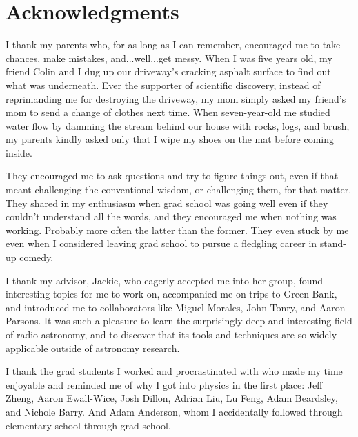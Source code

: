 % 

\cleardoublepage

\section*{Acknowledgments}

I thank my parents who, for as long as I can remember, encouraged me to take chances, make mistakes, and...well...get messy. When I was five years old, my friend Colin and I dug up our driveway's cracking asphalt surface to find out what was underneath. Ever the supporter of scientific discovery, instead of reprimanding me for destroying the driveway, my mom simply asked my friend's mom to send a change of clothes next time. When seven-year-old me studied water flow by damming the stream behind our house with rocks, logs, and brush, my parents kindly asked only that I wipe my shoes on the mat before coming inside. 

They encouraged me to ask questions and try to figure things out, even if that meant challenging the conventional wisdom, or challenging them, for that matter. They shared in my enthusiasm when grad school was going well even if they couldn't understand all the words, and they encouraged me when nothing was working. Probably more often the latter than the former. They even stuck by me even when I considered leaving grad school to pursue a fledgling career in stand-up comedy.

I thank my advisor, Jackie, who eagerly accepted me into her group, found interesting topics for me to work on, accompanied me on trips to Green Bank, and introduced me to collaborators like Miguel Morales, John Tonry, and Aaron Parsons. It was such a pleasure to learn the surprisingly deep and interesting field of radio astronomy, and to discover that its tools and techniques are so widely applicable outside of astronomy research.

I thank the grad students I worked and procrastinated with who made my time enjoyable and reminded me of why I got into physics in the first place: Jeff Zheng, Aaron Ewall-Wice, Josh Dillon, Adrian Liu, Lu Feng, Adam Beardsley, and Nichole Barry. And Adam Anderson, whom I accidentally followed through elementary school through grad school. 

